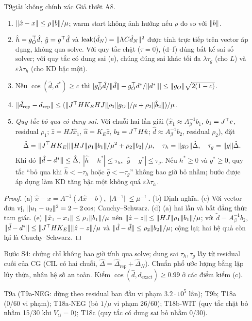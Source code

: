 \begin{namedthm}{T9}{giải không chính xác}
Giả thiết A8.
\begin{enumerate}[label=(\alph*)]
\item $\lVert \hat x-x\rVert\le\rho\lVert b\rVert/\mu$; warm start không ảnh hưởng nếu $\rho$ đo so với $\lVert b\rVert$.
\item $\hat h=g_O^{\top}\hat d$, $\hat g=g^{\top}\hat d$ và $\operatorname{leak}(\hat d_N)=\lVert \Lambda C\hat d_N\rVert^2$ được tính trực tiếp trên vector áp dụng, không qua solve. Với quy tắc chặt ($\tau=0$), (d--f) đúng bất kể sai số solver; với quy tắc có dung sai (e), chúng đúng sai khác tối đa $\lambda\tau_g$ (cho $L$) và $\varepsilon\lambda\tau_h$ (cho KD bậc một).
\item Nếu $\cos(\hat d,d^*)\ge c$ thì $|g_O^{\top}\hat d/\lVert \hat d\rVert-g_O^{\top} d^*/\lVert d^*\rVert|\le\lVert g_O\rVert\sqrt{2(1-c)}$.
\item $\lVert \hat d_{\mathrm{rep}}-d_{\mathrm{rep}}\rVert\le(\lVert J^{\top} HK_EHJ\rVert\rho_1\lVert g_O\rVert/\mu+\rho_2\lVert \hat b_2\rVert)/\mu$.
\item \emph{Quy tắc bỏ qua có dung sai.} Với chuỗi hai lần giải ($\hat x_1\approx A_\beta^{-1}b_1$, $b_1=J^{\top} e$, residual $\rho_1$; $\hat z=HJ\hat x_1$, $\hat u=K_E\hat z$, $b_2=J^{\top} H\hat u$; $\hat d\approx A_\beta^{-1}b_2$, residual $\rho_2$), đặt
\[
\hat\Delta=\lVert J^{\top} HK_E\rVert\lVert HJ\rVert\rho_1\lVert b_1\rVert/\mu^2+\rho_2\lVert b_2\rVert/\mu,\quad\tau_h=\lVert g_O\rVert\hat\Delta,\quad\tau_g=\lVert g\rVert\hat\Delta.
\]
Khi đó $\lVert \hat d-d^*\rVert\le\hat\Delta$, $|\hat h-h^*|\le\tau_h$, $|\hat g-g^*|\le\tau_g$. Nếu $h^*\ge0$ và $g^*\ge0$, quy tắc ``bỏ qua khi $\hat h<-\tau_h$ hoặc $\hat g<-\tau_g$'' không bao giờ bỏ nhầm; bước được áp dụng làm KD tăng bậc một không quá $\varepsilon\lambda\tau_h$.
\end{enumerate}
\end{namedthm}
\begin{proof}
(a) $\hat x-x=A^{-1}(A\hat x-b)$, $\lVert A^{-1}\rVert\le\mu^{-1}$. (b) Định nghĩa. (c) Với vector đơn vị, $\lVert u_1-u_2\rVert^2=2-2\cos$; Cauchy--Schwarz. (d) (a) hai lần và bất đẳng thức tam giác. (e) $\lVert \hat x_1-x_1\rVert\le\rho_1\lVert b_1\rVert/\mu$ nên $\lVert \hat z-z\rVert\le\lVert HJ\rVert\rho_1\lVert b_1\rVert/\mu$; với $\tilde d=A_\beta^{-1}b_2$, $\lVert \tilde d-d^*\rVert\le\lVert J^{\top} HK_E\rVert\lVert \hat z-z\rVert/\mu$ và $\lVert \hat d-\tilde d\rVert\le\rho_2\lVert b_2\rVert/\mu$; cộng lại; hai hệ quả còn lại là Cauchy--Schwarz.
\end{proof}
\begin{hequa}
Bước S4: chứng chỉ không bao giờ tính qua solve; dung sai $\tau_h,\tau_g$ lấy từ residual cuối của CG (CIL có hai chuỗi, $\hat\Delta=\hat\Delta_{\mathrm{rep}}+\hat\Delta_N$). Chuẩn phổ ước lượng bằng lặp lũy thừa, nhân hệ số an toàn. Kiểm $\cos(\hat d,d_{\mathrm{exact}})\ge0.99$ ở các điểm kiểm (c).
\end{hequa}
\begin{kiem}
T9a (T9a-NEG: dừng theo residual ban đầu vi phạm $3.2\cdot10^5$ lần); T9b; T18a (0/60 vi phạm); T18a-NEG (bỏ $1/\mu$ vi phạm 26/60); T18b-WIT (quy tắc chặt bỏ nhầm 15/30 khi $V_O=0$); T18c (quy tắc có dung sai bỏ nhầm 0/30).
\end{kiem}

